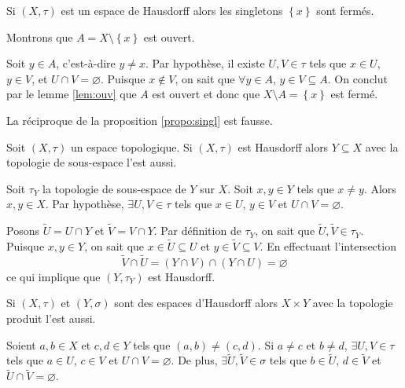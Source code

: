 \documentclass[french]{article}
\begin{document}
\begin{propo}\label{prop:singl}
  Si $(X, \tau)$ est un espace de Hausdorff alors les singletons $\left\{ x \right\}$ sont fermés.

  \tcblower
  \begin{preuve}
    Montrons que $A = X \setminus \left\{ x \right\}$ est ouvert.
    \par Soit $y \in A$, c'est-à-dire $y \not = x$. Par hypothèse, il existe  $U, V \in \tau$ tels que $x \in U$, $y \in V$, et $U \cap V = \varnothing$. Puisque $x \not \in V$, on sait que $\forall y \in A$, $y \in V \subseteq A$. On conclut par le lemme \ref{lem:ouv} que $A$ est ouvert et donc que $X \setminus A = \left\{ x \right\}$ est fermé.
  \end{preuve}
\end{propo}

\begin{remarque}
  La réciproque de la proposition \ref{propo:singl} est fausse.
\end{remarque}

\begin{propo}
  Soit $(X, \tau)$ un espace topologique. Si $(X, \tau)$ est Hausdorff alors $Y \subseteq X$ avec la topologie de sous-espace l'est aussi.

  \tcblower
  \begin{preuve}
    Soit $\tau_Y$ la topologie de sous-espace de $Y$ sur $X$. Soit $x, y \in Y$ tels que $x \not = y$. Alors $x, y \in X$. Par hypothèse, $\exists U, V \in \tau$ tels que $x \in U$, $y \in V$ et $U \cap V = \varnothing$.
    \par Posons $\tilde{U} = U \cap Y$ et $\tilde{V} = V \cap Y$. Par définition de  $\tau_Y$, on sait que  $\tilde{U}, \tilde{V} \in \tau_Y$. Puisque $x, y \in Y$, on sait que $x \in \tilde{U} \subseteq U$ et $y \in \tilde{V} \subseteq V$. En effectuant l'intersection
    $$\tilde{V} \cap \tilde{U} = (Y \cap V) \cap (Y \cap U) = \varnothing$$
    ce qui implique que $(Y, \tau_Y)$ est Hausdorff.
  \end{preuve}
\end{propo}
 
\begin{propo}
  Si $(X, \tau)$ et $(Y, \sigma)$ sont des espaces d'Hausdorff alors $X \times Y$ avec la topologie produit l'est aussi.

  \tcblower
  \begin{preuve}
    Soient $a, b \in X$ et $c, d \in Y$ tels que $(a, b) \not = (c, d)$. Si $a \not = c$ et $b \not = d$,  $\exists U, V \in \tau$ tels que $a \in U$, $c \in V$ et $U \cap V = \varnothing$. De plus, $\exists \tilde{U}, \tilde{V} \in \sigma$ tels que $b \in \tilde{U}$, $d \in \tilde{V}$ et $\tilde{U} \cap \tilde{V} = \varnothing$.
  \end{preuve}
\end{propo}
\end{document}
